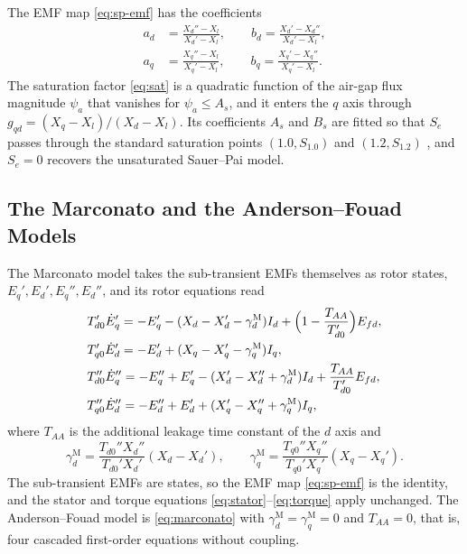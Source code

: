 \documentclass[10pt,journal]{IEEEtran}
\begin{document}
The EMF map \eqref{eq:sp-emf} has the coefficients
\begin{equation}\label{eq:ab}
\begin{aligned}
a_d&=\frac{X_d''-X_l}{X_d'-X_l},\qquad
b_d=\frac{X_d'-X_d''}{X_d'-X_l},\\
a_q&=\frac{X_q''-X_l}{X_q'-X_l},\qquad
b_q=\frac{X_q'-X_q''}{X_q'-X_l}.
\end{aligned}
\end{equation}
The saturation factor \eqref{eq:sat} is a quadratic function of the air-gap flux magnitude $\psi_a$ that vanishes for $\psi_a\le A_s$, and it enters the $q$ axis through $g_{qd}=(X_q-X_l)/(X_d-X_l)$.
Its coefficients $A_s$ and $B_s$ are fitted so that $S_e$ passes through the standard saturation points $(1.0,S_{1.0})$ and $(1.2,S_{1.2})$ \cite{cui2021}, and $S_e=0$ recovers the unsaturated Sauer--Pai model.

\subsection{The Marconato and the Anderson--Fouad Models}\label{ssec:marconato}

The Marconato model \cite{milano2010} takes the sub-transient EMFs themselves as rotor states, $E_q',E_d',E_q'',E_d''$, and its rotor equations read
\begin{subequations}\label{eq:marconato}
\begin{align}
&T_{d0}'\dot E_q'=-E_q'-(X_d-X_d'-\gamma_d^{\mathrm{M}})I_d+\Bigl(1-\frac{T_{AA}}{T_{d0}'}\Bigr)E_{fd},\\
&T_{q0}'\dot E_d'=-E_d'+(X_q-X_q'-\gamma_q^{\mathrm{M}})I_q,\\
&T_{d0}''\dot E_q''=-E_q''+E_q'-(X_d'-X_d''+\gamma_d^{\mathrm{M}})I_d+\frac{T_{AA}}{T_{d0}'}E_{fd},\\
&T_{q0}''\dot E_d''=-E_d''+E_d'+(X_q'-X_q''+\gamma_q^{\mathrm{M}})I_q,
\end{align}
\end{subequations}
where $T_{AA}$ is the additional leakage time constant of the $d$ axis and
\begin{equation}\label{eq:gamma-marconato}
\gamma_d^{\mathrm{M}}=\frac{T_{d0}''X_d''}{T_{d0}'X_d'}(X_d-X_d'),\qquad
\gamma_q^{\mathrm{M}}=\frac{T_{q0}''X_q''}{T_{q0}'X_q'}(X_q-X_q').
\end{equation}
The sub-transient EMFs are states, so the EMF map \eqref{eq:sp-emf} is the identity, and the stator and torque equations \eqref{eq:stator}--\eqref{eq:torque} apply unchanged.
The Anderson--Fouad model \cite{milano2010} is \eqref{eq:marconato} with $\gamma_d^{\mathrm{M}}=\gamma_q^{\mathrm{M}}=0$ and $T_{AA}=0$, that is, four cascaded first-order equations without coupling.
\end{document}
